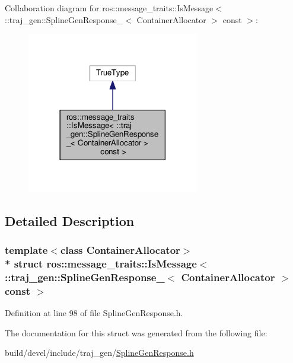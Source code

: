 Collaboration diagram for ros\+:\+:message\+\_\+traits\+:\+:Is\+Message$<$ \+:\+:traj\+\_\+gen\+:\+:Spline\+Gen\+Response\+\_\+$<$ Container\+Allocator $>$ const $>$\+:
\nopagebreak
\begin{figure}[H]
\begin{center}
\leavevmode
\includegraphics[width=213pt]{structros_1_1message__traits_1_1_is_message_3_01_1_1traj__gen_1_1_spline_gen_response___3_01_con5dfd9680698872773ba2bc9cf9479dd3}
\end{center}
\end{figure}


\subsection{Detailed Description}
\subsubsection*{template$<$class Container\+Allocator$>$\\*
struct ros\+::message\+\_\+traits\+::\+Is\+Message$<$ \+::traj\+\_\+gen\+::\+Spline\+Gen\+Response\+\_\+$<$ Container\+Allocator $>$ const  $>$}



Definition at line 98 of file Spline\+Gen\+Response.\+h.



The documentation for this struct was generated from the following file\+:\begin{DoxyCompactItemize}
\item 
build/devel/include/traj\+\_\+gen/\hyperlink{_spline_gen_response_8h}{Spline\+Gen\+Response.\+h}\end{DoxyCompactItemize}
